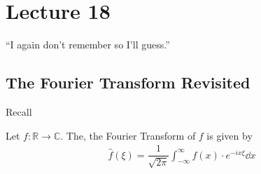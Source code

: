 \section{Lecture 18}
``I again don't remember so I'll guess.''

\subsection{The Fourier Transform Revisited}
Recall
\begin{definition}
    Let $f: \mathbb{R}\to\mathbb{C}$. The, the Fourier Transform of $f$ is given by
    \begin{align}
        \hat{f}(\xi) = \dfrac{1}{\sqrt{2\pi}} \int_{-\infty}^\infty f(x) \cdot e^{-ix\xi} \dd{x}
    \end{align}
\end{definition}


